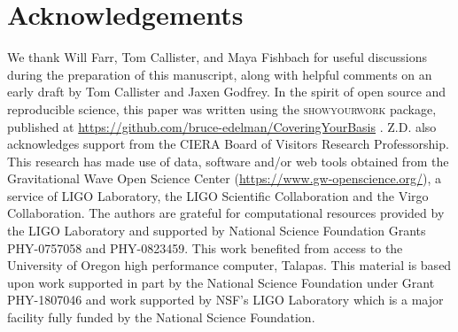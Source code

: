 \documentclass[twocolumn, linenumbers]{aastex631}
\begin{document}
\section{Acknowledgements}\label{sec:acknowledments}
We thank Will Farr, Tom Callister, and Maya Fishbach for useful discussions during the preparation of this manuscript, 
along with helpful comments on an early draft by Tom Callister and Jaxen Godfrey. In the spirit of open source and reproducible science, this paper was written using the \textsc{showyourwork} package, published at \url{https://github.com/bruce-edelman/CoveringYourBasis} \citep{Luger2021}. Z.D. also acknowledges support from the CIERA Board
of Visitors Research Professorship. This research has made use of data, software and/or web tools obtained from the Gravitational Wave Open Science Center 
(\url{https://www.gw-openscience.org/}), a service of LIGO Laboratory, the LIGO Scientific Collaboration and the Virgo Collaboration. 
The authors are grateful for computational resources provided by the LIGO Laboratory and supported by National Science Foundation Grants PHY-0757058 and PHY-0823459.  
This work benefited from access to the University of Oregon high performance computer, Talapas. This material is based upon work supported 
in part by the National Science Foundation under Grant PHY-1807046 and work supported by NSF's LIGO Laboratory which is a major facility 
fully funded by the National Science Foundation.
{}



\end{document}

